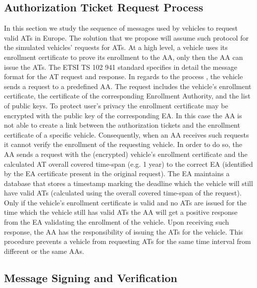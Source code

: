 \subsection{Authorization Ticket Request Process} \label{auth_process}
In this section we study the sequence of messages used by vehicles to request valid ATs in Europe. The solution that we propose will assume such protocol for the simulated vehicles' requests for ATs.
At a high level, a vehicle uses its enrollment certificate to prove its enrollment to the AA, only then the AA can issue the ATs.
The ETSI TS 102 941 \cite{etsi_privacy} standard specifies in detail the message format for the AT request and response. In regards to the process \cite{generic_eu}, the vehicle sends a request to a predefined AA. The request includes the vehicle's enrollment certificate, the certificate of the corresponding Enrollment Authority, and the list of public keys. To protect user's privacy the enrollment certificate may be encrypted with the public key of the corresponding EA. In this case the AA is not able to create a link between the authorization tickets and the enrollment certificate of a specific vehicle. Consequently, when an AA receives such requests it cannot verify the enrollment of the requesting vehicle. In order to do so, the AA sends a request with the (encrypted) vehicle's enrollment certificate and the calculated AT overall covered time-span (e.g. 1 year) to the correct EA (identified by the EA certificate present in the original request). The EA maintains a database that stores a timestamp marking the deadline which the vehicle will still have valid ATs (calculated using the overall covered time-span of the request). Only if the vehicle's enrollment certificate is valid and no ATs are issued for the time which the vehicle still has valid ATs the AA will get a positive response from the EA validating the enrollment of the vehicle. Upon receiving such response, the AA has the responsibility of issuing the ATs for the vehicle. This procedure prevents a vehicle from requesting ATs for the same time interval from different or the same AAs.


\subsection{Message Signing and Verification}

